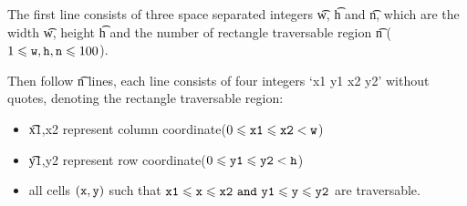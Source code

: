 The first line consists of three space separated integers \t{w}, \t{h} and \t{n},
which are the width \t{w}, height \t{h} and the number of rectangle traversable region \t{n} ($1 \le \t{w},\t{h},\t{n} \le 100$).

Then follow \t{n} lines, each line consists of four integers \t{`x1 y1 x2 y2'} without quotes,
  denoting the rectangle traversable region:
\begin{itemize}
  \item \t{x1,x2} represent column coordinate($0\leq\t{x1}\leq\t{x2}<\t{w}$)
  \item \t{y1,y2} represent row coordinate($0 \leq\t{y1}\leq\t{y2}<\t{h}$)
  \item all cells $(\t{x}, \t{y})$ such that $\t{x1} \leq \t{x} \leq \t{x2}\ \t{and}\ \t{y1} \leq \t{y} \leq \t{y2}$ are traversable.
\end{itemize}
